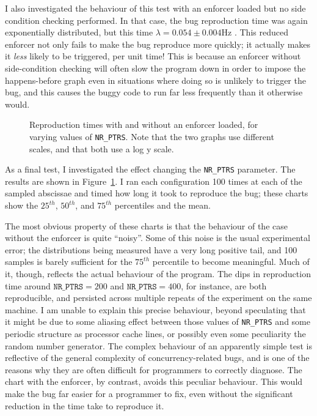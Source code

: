 I also investigated the behaviour of this test with an enforcer loaded
but no side condition checking performed.  In that case, the bug
reproduction time was again exponentially distributed, but this time
$\lambda = 0.054 \pm 0.004$Hz .  This reduced enforcer not only fails to make the bug
reproduce more quickly; it actually makes it \emph{less} likely to be
triggered, per unit time!  This is because an enforcer without
side-condition checking will often slow the program down in order to
impose the happens-before graph even in situations where doing so is
unlikely to trigger the bug, and this causes the buggy code to run far
less frequently than it otherwise would.

\begin{figure}
  \caption{Reproduction times with and without an enforcer loaded, for
    varying values of \texttt{NR\_PTRS}.  Note that the two graphs use
    different scales, and that both use a log y scale.}
  \label{fig:eval:indexed_toctou:nr_ptrs}
\end{figure}

As a final test, I investigated the effect changing the
\texttt{NR\_PTRS} parameter.  The results are shown in
Figure~\ref{fig:eval:indexed_toctou:nr_ptrs}.  I ran each
configuration 100 times at each of the sampled abscissae and timed how
long it took to reproduce the bug; these charts show the $25^{th}$,
$50^{th}$, and $75^{th}$ percentiles and the mean.

The most obvious property of these charts is that the behaviour of the
case without the enforcer is quite ``noisy''.  Some of this noise is
the usual experimental error; the distributions being measured have a
very long positive tail, and 100 samples is barely sufficient for the
$75^{th}$ percentile to become meaningful.  Much of it, though,
reflects the actual behaviour of the program.  The dips in
reproduction time around $\texttt{NR\_PTRS} = 200$ and
$\texttt{NR\_PTRS} = 400$, for instance, are both reproducible, and
persisted across multiple repeats of the experiment on the same
machine.  I am unable to explain this precise behaviour, beyond
speculating that it might be due to some aliasing effect between those
values of \texttt{NR\_PTRS} and some periodic structure as processor
cache lines, or possibly even some peculiarity the random number
generator.  The complex behaviour of an apparently simple test is
reflective of the general complexity of concurrency-related bugs, and
is one of the reasons why they are often difficult for programmers to
correctly diagnose\needCite{}.  The chart with the enforcer, by
contrast, avoids this peculiar behaviour.  This would make the bug far
easier for a programmer to fix, even without the significant reduction
in the time take to reproduce it.

